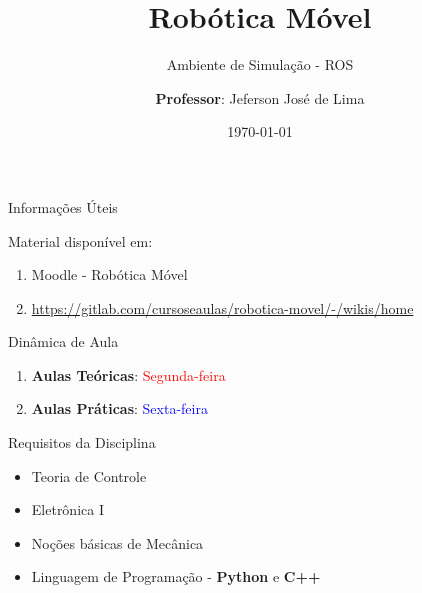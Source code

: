 \documentclass{beamer}
\title{Robótica Móvel}
\subtitle{Ambiente de Simulação - ROS}
\date{\today}
\author[Jeferson José de Lima]{
  \textbf{Professor}: Jeferson José de Lima}
\institute[UTFPR-PB]{Departamento de Informática (DAINF)}
\begin{document}
\maketitle
\justify


\begin{frame}{Informações Úteis}
	\begin{block}{Material disponível em:}
		\begin{enumerate}
			\item Moodle - Robótica Móvel
			\item \href{https://gitlab.com/cursoseaulas/robotica-movel/-/wikis/home}{https://gitlab.com/cursoseaulas/robotica-movel/-/wikis/home}
		\end{enumerate}
	\end{block}
	\begin{block}{Dinâmica de Aula}
		\begin{enumerate}
			\item \textbf{Aulas Teóricas}: \textcolor{red}{Segunda-feira}
			\item \textbf{Aulas Práticas}: \textcolor{blue}{Sexta-feira}
		\end{enumerate}
	\end{block}
	\begin{block}{Requisitos da Disciplina}
		\begin{itemize}
			\item Teoria de Controle
			\item Eletrônica I
			\item Noções básicas de Mecânica
			\item Linguagem de Programação - \textbf{Python} e \textbf{C++}
		\end{itemize}
	\end{block}
\end{frame}





\end{document}
